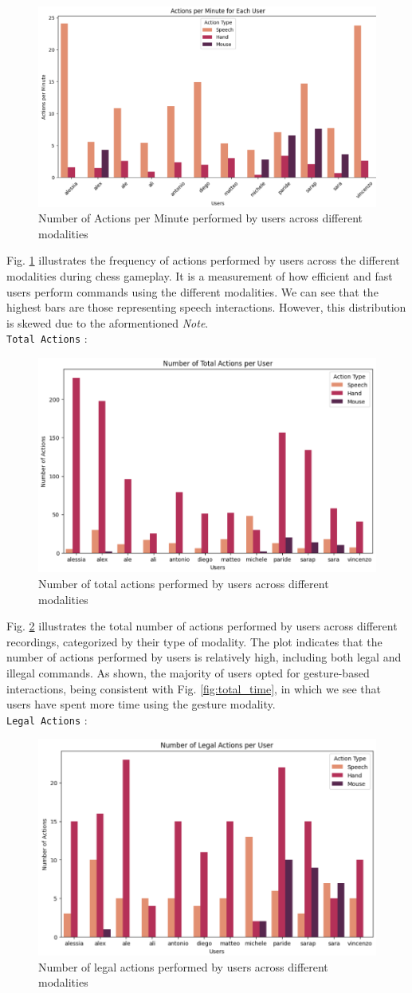 \documentclass[a4paper, 11pt, twocolumn]{IEEEtran}
\begin{document}
    \begin{figure}
        \centering
        \includegraphics[width=.5\textwidth]{images/actions_per_minutes.png}
        \caption{Number of Actions per Minute performed by users across different modalities}
        \label{fig:actions_per_minutes}
    \end{figure}
    Fig. \ref{fig:actions_per_minutes} illustrates the frequency of actions performed by users across the different modalities during chess gameplay. It is a measurement of how efficient and fast users perform commands using the different modalities. We can see that the highest bars are those representing speech interactions. However, this distribution is skewed due to the aformentioned \emph{Note}. \\\texttt{Total Actions} : 
    \begin{figure}
        \centering
        \includegraphics[width=.5\textwidth]{images/total_actions.png}
        \caption{Number of total actions performed by users across different modalities}
        \label{fig:total_actions}
    \end{figure}
    Fig. \ref{fig:total_actions} illustrates the total number of actions performed by users across different recordings, categorized by their type of modality. The plot indicates that the number of actions performed by users is relatively high, including both legal and illegal commands. As shown, the majority of users opted for gesture-based interactions, being consistent with Fig. \ref{fig:total_time}, in which we see that users have spent more time using the gesture modality. \\\texttt{Legal Actions} : 
    \begin{figure}
        \centering
        \includegraphics[width=.5\textwidth]{images/legal_actions.png}
        \caption{Number of legal actions performed by users across different modalities}
        \label{fig:legal_actions}
    \end{figure}
\end{document}
